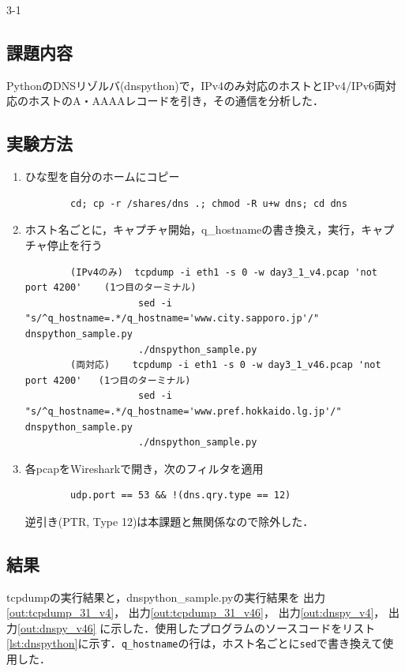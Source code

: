 \begin{maintask}{3-1}
  \subsection*{課題内容}
  PythonのDNSリゾルバ(dnspython)で，IPv4のみ対応のホストとIPv4/IPv6両対応のホストのA・AAAAレコードを引き，その通信を分析した．

  \subsection*{実験方法}
  \begin{enumerate}
    \item ひな型を自分のホームにコピー
      \begin{verbatim}
        cd; cp -r /shares/dns .; chmod -R u+w dns; cd dns
      \end{verbatim}

    \item ホスト名ごとに，キャプチャ開始，q\_hostnameの書き換え，実行，キャプチャ停止を行う
      \begin{verbatim}
        (IPv4のみ)  tcpdump -i eth1 -s 0 -w day3_1_v4.pcap 'not port 4200'    (1つ目のターミナル)
                    sed -i "s/^q_hostname=.*/q_hostname='www.city.sapporo.jp'/" dnspython_sample.py
                    ./dnspython_sample.py
        (両対応)    tcpdump -i eth1 -s 0 -w day3_1_v46.pcap 'not port 4200'   (1つ目のターミナル)
                    sed -i "s/^q_hostname=.*/q_hostname='www.pref.hokkaido.lg.jp'/" dnspython_sample.py
                    ./dnspython_sample.py
      \end{verbatim}

    \item 各pcapをWiresharkで開き，次のフィルタを適用
      \begin{verbatim}
        udp.port == 53 && !(dns.qry.type == 12)
      \end{verbatim}
      逆引き(PTR, Type 12)は本課題と無関係なので除外した．
  \end{enumerate}

  \subsection*{結果}
  tcpdumpの実行結果と，dnspython\_sample.pyの実行結果を
  出力\ref{out:tcpdump_31_v4}，
  出力\ref{out:tcpdump_31_v46}，
  出力\ref{out:dnspy_v4}，
  出力\ref{out:dnspy_v46}
  に示した．使用したプログラムのソースコードをリスト\ref{lst:dnspython}に示す．\texttt{q\_hostname}の行は，ホスト名ごとに\texttt{sed}で書き換えて使用した．


\end{maintask}
